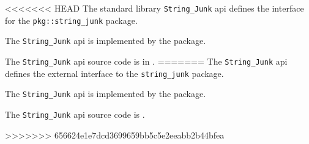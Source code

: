 
<<<<<<< HEAD
The standard library {\tt String\_Junk} api defines the interface for the {\tt pkg::string\_junk} package.

The {\tt String\_Junk} api is implemented by the 
 package.

The {\tt String\_Junk} api source code is in .
=======
The {\tt String\_Junk} api defines the external interface to the {\tt string\_junk} package.

The {\tt String\_Junk} api is implemented by the  package.

The {\tt String\_Junk} api source code is .

>>>>>>> 656624e1e7dcd3699659bb5c5e2eeabb2b44bfea
